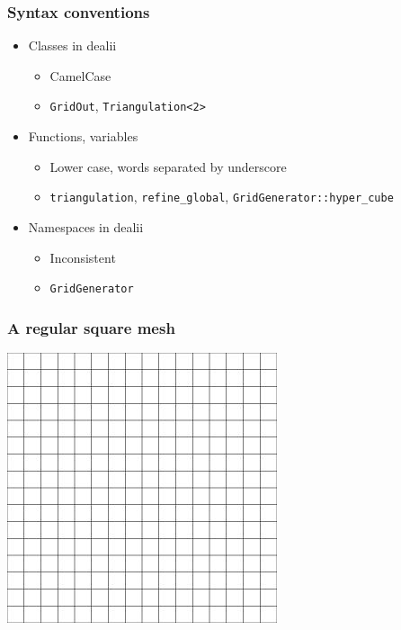 \begin{frame}
  \frametitle{Syntax conventions}
  \begin{itemize}
  \item Classes in dealii
    \begin{itemize}
    \item CamelCase
    \item \lstinline!GridOut!, \lstinline!Triangulation<2>!
    \end{itemize}
  \item Functions, variables
    \begin{itemize}
    \item Lower case, words separated by underscore
    \item \lstinline!triangulation!, \lstinline!refine_global!,
      \lstinline!GridGenerator::hyper_cube!
    \end{itemize}
  \item Namespaces in dealii
    \begin{itemize}
    \item Inconsistent
    \item \lstinline!GridGenerator!
    \end{itemize}
  \end{itemize}
\end{frame}

\begin{frame}
  \frametitle{A regular square mesh}
  \begin{center}
    \includegraphics[height=.8\textheight]{graph/step1-1}
  \end{center}
\end{frame}

